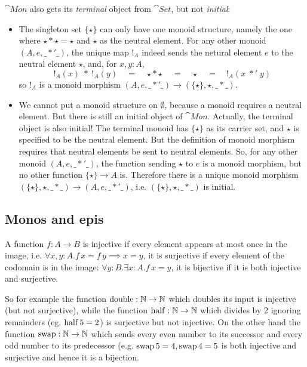 \begin{Answer}
  $\cat{Mon}$ also gets its \emph{terminal} object from $\cat{Set}$, but not \emph{initial}:
  \begin{itemize}
    \item The singleton set $\{\star\}$ can only have one monoid structure, namely the one where $\star * \star = \star$ and $\star$ as the neutral element. For any other monoid $(A,e,\_*'\_)$, the unique map $!_A$ indeed sends the netural element $e$ to the neutral element $\star$, and, for $x,y\colon A$,
    \[ !_A(x)\;*\;!_A(y) \quad=\quad \star * \star \quad=\quad \star \quad=\quad !_A(x\;*'\;y) \]
    so $!_A$ is a monoid morphism $(A,e,\_*'\_) \to (\{\star\},\star,\_*\_)$.
    \item We cannot put a monoid structure on $\emptyset$, because a monoid requires a neutral element. But there is still an initial object of $\cat{Mon}$. Actually, the terminal object is also initial! The terminal monoid has $\{\star\}$ as its carrier set, and $\star$ is specified to be the neutral element. But the definition of monoid morphism requires that neutral elements be sent to neutral elements. So, for any other monoid $(A,e,\_*'\_)$, the function sending $\star$ to $e$ is a monoid morphism, but no other function $\{\star\}\to A$ is. Therefore there is a unique monoid morphism $(\{\star\},\star,\_*\_)\to (A,e,\_*'\_)$, i.e. $(\{\star\},\star,\_*\_)$ is initial.
  \end{itemize}
\end{Answer}

\subsection{Monos and epis}
\label{sec:monos-epis}

A function $f:A\to B$ is injective if every element appears at most once in the image, i.e. $\forall x,y:A.f\,x = f\,y \implies x = y$, it is surjective if every element of the codomain is in the image: $\forall y:B.\exists x:A.f\,x = y$, it is bijective if it is both injective and surjective. 

So for example the function $\mathrm{double} : \mathbb{N} \to \mathbb{N}$ which doubles its input is injective (but not surjective), while the function $\mathrm{half} : \mathbb{N} \to \mathbb{N}$ which divides by 2 ignoring remainders (eg. $\mathrm{half}\,5 = 2$) is surjective but not injective. On the other hand the function $\mathrm{swap} : \mathbb{N} \to \mathbb{N}$ which sends every even number to its successor and every odd number to its predecessor (e.g. $\mathrm{swap}\,5 = 4, \mathrm{swap}\,4 = 5$ is both injective and surjective and hence it is a bijection.  

